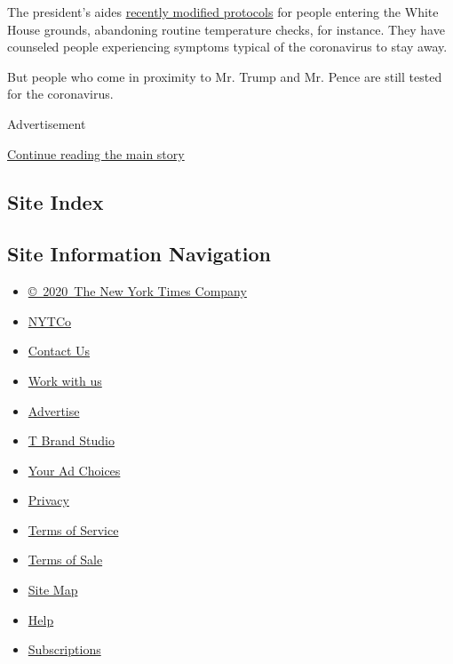 The president's aides
\href{https://www.nytimes3xbfgragh.onion/2020/06/22/us/politics/white-house-coronavirus-restrictions.html}{recently
modified protocols} for people entering the White House grounds,
abandoning routine temperature checks, for instance. They have counseled
people experiencing symptoms typical of the coronavirus to stay away.

But people who come in proximity to Mr. Trump and Mr. Pence are still
tested for the coronavirus.

Advertisement

\protect\hyperlink{after-bottom}{Continue reading the main story}

\hypertarget{site-index}{%
\subsection{Site Index}\label{site-index}}

\hypertarget{site-information-navigation}{%
\subsection{Site Information
Navigation}\label{site-information-navigation}}

\begin{itemize}
\tightlist
\item
  \href{https://help.nytimes3xbfgragh.onion/hc/en-us/articles/115014792127-Copyright-notice}{©~2020~The
  New York Times Company}
\end{itemize}

\begin{itemize}
\tightlist
\item
  \href{https://www.nytco.com/}{NYTCo}
\item
  \href{https://help.nytimes3xbfgragh.onion/hc/en-us/articles/115015385887-Contact-Us}{Contact
  Us}
\item
  \href{https://www.nytco.com/careers/}{Work with us}
\item
  \href{https://nytmediakit.com/}{Advertise}
\item
  \href{http://www.tbrandstudio.com/}{T Brand Studio}
\item
  \href{https://www.nytimes3xbfgragh.onion/privacy/cookie-policy\#how-do-i-manage-trackers}{Your
  Ad Choices}
\item
  \href{https://www.nytimes3xbfgragh.onion/privacy}{Privacy}
\item
  \href{https://help.nytimes3xbfgragh.onion/hc/en-us/articles/115014893428-Terms-of-service}{Terms
  of Service}
\item
  \href{https://help.nytimes3xbfgragh.onion/hc/en-us/articles/115014893968-Terms-of-sale}{Terms
  of Sale}
\item
  \href{https://spiderbites.nytimes3xbfgragh.onion}{Site Map}
\item
  \href{https://help.nytimes3xbfgragh.onion/hc/en-us}{Help}
\item
  \href{https://www.nytimes3xbfgragh.onion/subscription?campaignId=37WXW}{Subscriptions}
\end{itemize}
